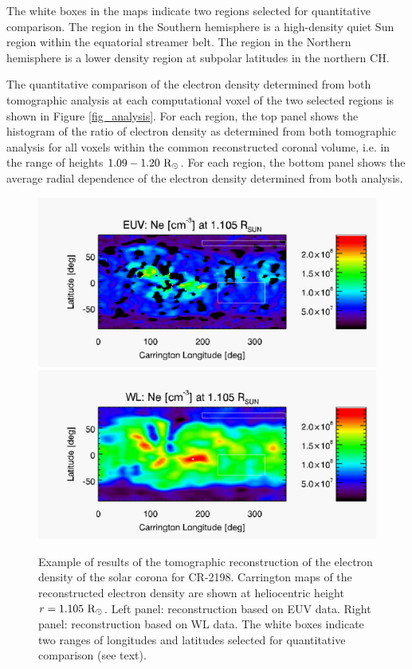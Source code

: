 \documentclass[baaa]{baaa}
\begin{document}
The white boxes in the maps indicate two regions selected for quantitative comparison. The region in the Southern hemisphere is a high-density quiet Sun region within the equatorial streamer belt. The region in the Northern hemisphere is a lower density region at subpolar latitudes in the northern CH.

The quantitative comparison of the electron density determined from both tomographic analysis at each computational voxel of the two selected regions is shown in Figure \ref{fig_analysis}. For each region, the top panel shows the histogram of the ratio of electron density as determined from both tomographic analysis for all voxels within the common reconstructed coronal volume, i.e. in the range of heights $1.09-1.20~\rm{R}_\odot$.
For each region, the bottom panel shows the average radial dependence of the electron density determined from both analysis.

\begin{figure}[t]
  \centering
  \includegraphics[width=\columnwidth]{map_ne_aia.pdf}
  \includegraphics[width=\columnwidth]{map_ne_kcor.pdf}
  \caption{Example of results of the tomographic reconstruction of the electron density of the solar corona for CR-2198. Carrington maps of the reconstructed electron density are shown at heliocentric height $r=1.105~\rm{R}_\odot$. Left panel: reconstruction based on EUV data. Right panel: reconstruction based on WL data. The white boxes indicate two ranges of longitudes and latitudes selected for quantitative comparison (see text).}
  \label{fig_maps}
\end{figure}
\end{document}
